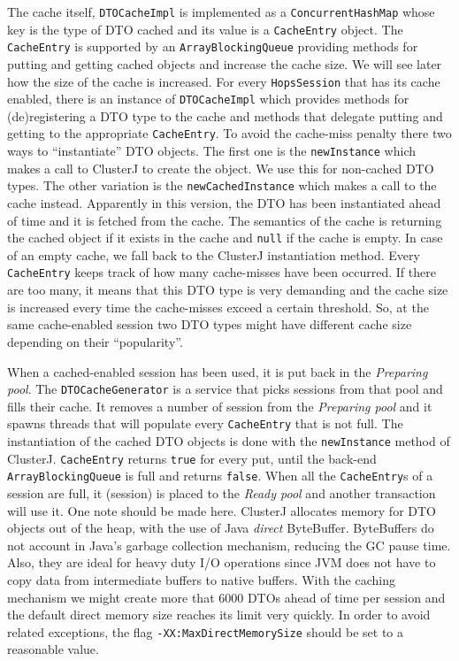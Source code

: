 The cache itself, \texttt{DTOCacheImpl} is implemented as a \texttt{ConcurrentHashMap} whose
key is the type of DTO cached and its value is a \texttt{CacheEntry}
object. The \texttt{CacheEntry} is supported by an
\texttt{ArrayBlockingQueue} providing methods for putting and getting
cached objects and increase the cache size. We will see later how
the size of the cache is increased. For every \texttt{HopsSession}
that has its cache enabled, there is an instance of
\texttt{DTOCacheImpl} which provides methods for (de)registering a DTO
type to the cache and methods that delegate putting and getting to the
appropriate \texttt{CacheEntry}. To avoid the cache-miss penalty there
two ways to ``instantiate'' DTO objects. The first one is the
\texttt{newInstance} which makes a call to ClusterJ to create the
object. We use this for non-cached DTO types. The other variation is
the \texttt{newCachedInstance} which makes a call to the cache
instead. Apparently in this version, the DTO has been instantiated
ahead of time and it is fetched from the cache. The semantics of the
cache is returning the cached object if
it exists in the cache and \texttt{null} if the cache is empty. In
case of an empty cache, we fall back to the ClusterJ instantiation
method. Every \texttt{CacheEntry} keeps track of how many cache-misses
have been occurred. If there are too many, it means that this DTO type
is very demanding and the cache size is increased every time the
cache-misses exceed a certain threshold. So, at the same cache-enabled
session two DTO types might have different cache size depending on
their ``popularity''.

When a cached-enabled session has been used, it is put back in the
\emph{Preparing pool}. The \texttt{DTOCacheGenerator} is a service
that picks sessions from that pool and fills their cache. It removes a
number of session from the \emph{Preparing pool} and it spawns threads
that will populate every \texttt{CacheEntry} that is not
full. The instantiation of the cached DTO objects is done with the
\texttt{newInstance} method of ClusterJ. \texttt{CacheEntry} returns
\texttt{true} for every put, until
the back-end \texttt{ArrayBlockingQueue} is full and returns
\texttt{false}. When all the \texttt{CacheEntry}s of a session are
full, it (session) is placed to the \emph{Ready pool} and another
transaction will use it. One note should be made here. ClusterJ
allocates memory for DTO objects out of the heap, with the use of
Java \emph{direct} ByteBuffer. ByteBuffers do not account in Java's
garbage collection mechanism, reducing the GC pause time. Also, they are ideal
for heavy duty I/O operations since JVM does not have to copy data
from intermediate buffers to native buffers. With the caching
mechanism we might create more that 6000 DTOs ahead of time per
session and the default direct memory size reaches its limit very
quickly. In order to avoid related exceptions, the flag
\texttt{-XX:MaxDirectMemorySize} should be set to a reasonable value.

